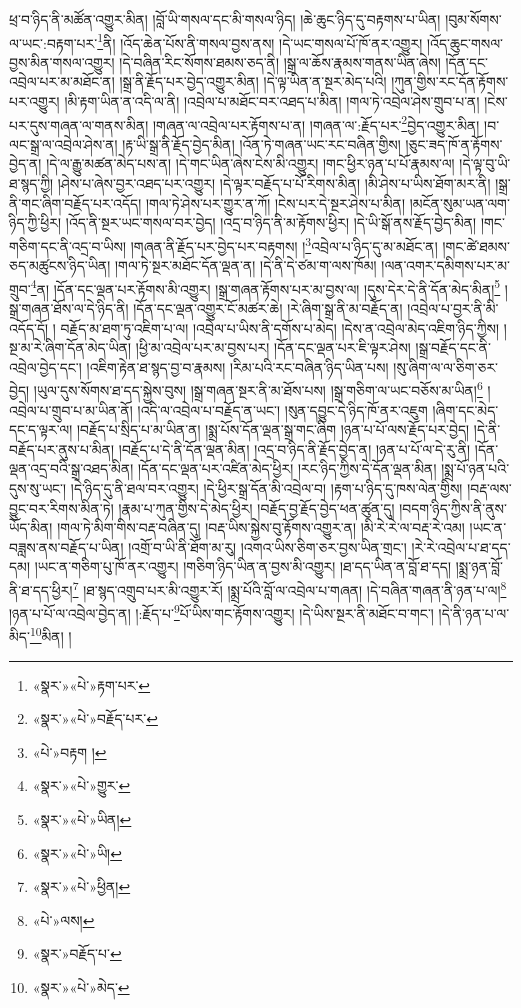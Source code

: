 ཕྲ་བ་ཉིད་ནི་མཚོན་འགྱུར་མིན། །བློ་ཡི་གསལ་དང་མི་གསལ་ཉིད། །ཆེ་ཆུང་ཉིད་དུ་བརྟགས་པ་ཡིན། །བུམ་སོགས་ལ་ཡང་:བརྟག་པར་\footnote{«སྣར་»«པེ་»རྟག་པར་}ནི། །འོད་ཆེན་པོས་ནི་གསལ་བྱས་ནས། །དེ་ཡང་གསལ་པོ་ཁོ་ནར་འགྱུར། །འོད་ཆུང་གསལ་བྱས་མིན་གསལ་འགྱུར། །དེ་བཞིན་རིང་སོགས་ཐམས་ཅད་ནི། །སྒྲ་ལ་ཆོས་རྣམས་གནས་ཡིན་ཞེས། །དོན་དང་འབྲེལ་པར་མ་མཐོང་ན། །སྒྲ་ནི་རྗོད་པར་བྱེད་འགྱུར་མིན། །དེ་ལྟ་ཡིན་ན་སྔར་མེད་པའི། །ཀུན་གྱིས་རང་དོན་རྟོགས་པར་འགྱུར། །མི་རྟག་ཡིན་ན་འདི་ལ་ནི། །འབྲེལ་པ་མཐོང་བར་འཐད་པ་མིན། །གལ་ཏེ་འབྲེལ་ཤེས་གྲུབ་པ་ན། །ངེས་པར་དུས་གཞན་ལ་གནས་མིན། །གཞན་ལ་འབྲེལ་པར་རྟོགས་པ་ན། །གཞན་ལ་:རྗོད་པར་\footnote{«སྣར་»«པེ་»བརྗོད་པར་}བྱེད་འགྱུར་མིན། །བ་ལང་སྒྲ་ལ་འབྲེལ་ཤེས་ན། །རྟ་ཡི་སྒྲ་ནི་རྗོད་བྱེད་མིན། །འོན་ཏེ་གཞན་ཡང་རང་བཞིན་གྱིས། །ཅུང་ཟད་ཁོ་ན་རྟོགས་བྱེད་ན། །དེ་ལ་རྒྱུ་མཚན་མེད་པས་ན། །དེ་གང་ཡིན་ཞེས་ངེས་མི་འགྱུར། །གང་ཕྱིར་ཉན་པ་པོ་རྣམས་ལ། །དེ་ལྟ་བུ་ཡི་ཐ་སྙད་ཀྱི། །ཤེས་པ་ཞེས་བྱར་འཐད་པར་འགྱུར། །དེ་ལྟར་བརྗོད་པ་པོ་རིགས་མིན། །མི་ཤེས་པ་ཡིས་ཐོག་མར་ནི། །སྒྲ་ནི་གང་ཞིག་བརྗོད་པར་འདོད། །གལ་ཏེ་ཤེས་པར་གྱུར་ན་ཀོ། །ངེས་པར་དེ་སྔར་ཤེས་པ་མིན། །མངོན་སུམ་ཡན་ལག་ཉིད་ཀྱི་ཕྱིར། །འོད་ནི་སྔར་ཡང་གསལ་བར་བྱེད། །འདྲ་བ་ཉིད་ནི་མ་རྟོགས་ཕྱིར། །དེ་ཡི་སྒོ་ནས་རྗོད་བྱེད་མིན། །གང་གཅིག་དང་ནི་འདྲ་བ་ཡིས། །གཞན་ནི་རྗོད་པར་བྱེད་པར་བརྟགས། །\footnote{«པེ་»བརྟག །}འབྲེལ་པ་ཉིད་དུ་མ་མཐོང་ན། །གང་ཚེ་ཐམས་ཅད་མཚུངས་ཉིད་ཡིན། །གལ་ཏེ་སྔར་མཐོང་དོན་ལྡན་ན། །དེ་ནི་དེ་ཙམ་ག་ལས་ཁོམ། །ལན་འགར་དམིགས་པར་མ་གྲུབ་\footnote{«སྣར་»«པེ་»གྱུར་}ན། །དོན་དང་ལྡན་པར་རྟོགས་མི་འགྱུར། །སྒྲ་གཞན་རྟོགས་པར་མ་བྱས་ལ། །དུས་དེར་དེ་ནི་དོན་མེད་མིན།\footnote{«སྣར་»«པེ་»ཡིན།} །སྒྲ་གཞན་ཐོས་ལ་དེ་ཉིད་ནི། །དོན་དང་ལྡན་འགྱུར་ངོ་མཚར་ཆེ། །རེ་ཞིག་སྒྲ་ནི་མ་བརྗོད་ན། །འབྲེལ་པ་བྱར་ནི་མི་འདོད་དོ། །
བརྗོད་མ་ཐག་ཏུ་འཇིག་པ་ལ། །འབྲེལ་པ་ཡིས་ནི་དགོས་པ་མེད། །དེས་ན་འབྲེལ་མེད་འཇིག་ཉིད་ཀྱིས། །སྔ་མ་རེ་ཞིག་དོན་མེད་ཡིན། །ཕྱི་མ་འབྲེལ་པར་མ་བྱས་པར། །དོན་དང་ལྡན་པར་ཇི་ལྟར་ཤེས། །སྒྲ་བརྗོད་དང་ནི་འབྲེལ་བྱེད་དང་། །འཇིག་རྟེན་ཐ་སྙད་བྱ་བ་རྣམས། །རིམ་པའི་རང་བཞིན་ཉིད་ཡིན་པས། །སུ་ཞིག་ལ་ལ་ཅིག་ཅར་བྱེད། །ཡུལ་དུས་སོགས་ཐ་དད་སྐྱེས་བུས། །སྒྲ་གཞན་སྔར་ནི་མ་ཐོས་པས། །སྒྲ་གཅིག་ལ་ཡང་བཅོས་མ་ཡིན།\footnote{«སྣར་»«པེ་»ཡི།} །འབྲེལ་པ་གྲུབ་པ་མ་ཡིན་ནོ། །འདི་ལ་འབྲེལ་པ་བརྗོད་ན་ཡང་། །སུན་དབྱུང་དེ་ཉིད་ཁོ་ནར་འཇུག །ཞིག་དང་མེད་དང་ད་ལྟར་ལ། །བརྗོད་པ་སྲིད་པ་མ་ཡིན་ན། །སྨྲ་པོས་དོན་ལྡན་སྒྲ་གང་ཞིག །ཉན་པ་པོ་ལས་རྗོད་པར་བྱེད། །དེ་ནི་བརྗོད་པར་ནུས་པ་མིན། །བརྗོད་པ་དེ་ནི་དོན་ལྡན་མིན། །འདྲ་བ་ཉིད་ནི་རྗོད་བྱེད་ན། །ཉན་པ་པོ་ལ་དེ་རུ་ནི། །དོན་ལྡན་འདྲ་བའི་སྒྲ་འཐད་མིན། །དོན་དང་ལྡན་པར་འཛིན་མེད་ཕྱིར། །རང་ཉིད་ཀྱིས་དེ་དོན་ལྡན་མིན། །སྨྲ་པོ་ཉན་པའི་དུས་སུ་ཡང་། །དེ་ཉིད་དུ་ནི་ཐལ་བར་འགྱུར། །དེ་ཕྱིར་སྒྲ་དོན་མི་འབྲེལ་བ། །རྟག་པ་ཉིད་དུ་ཁས་ལེན་གྱིས། །བརྡ་ལས་བྱུང་བར་རིགས་མིན་ཏེ། །རྣམ་པ་ཀུན་གྱིས་དེ་མེད་ཕྱིར། །བརྗོད་བྱ་རྗོད་བྱེད་ཕན་ཚུན་དུ། །བདག་ཉིད་ཀྱིས་ནི་ནུས་ཡོད་མིན། །གལ་ཏེ་མིག་གིས་བརྡ་བཞིན་དུ། །བརྡ་ཡིས་སྐྱེས་བུ་རྟོགས་འགྱུར་ན། །མི་རེ་རེ་ལ་བརྡ་རེ་འམ། །ཡང་ན་བཟླས་ནས་བརྗོད་པ་ཡིན། །འགྲོ་བ་ཡི་ནི་ཐོག་མ་རུ། །འགའ་ཡིས་ཅིག་ཅར་བྱས་ཡིན་གྲང་། །རེ་རེ་འབྲེལ་པ་ཐ་དད་དམ། །ཡང་ན་གཅིག་པུ་ཁོ་ནར་འགྱུར། །གཅིག་ཉིད་ཡིན་ན་བྱས་མི་འགྱུར། །ཐ་དད་ཡིན་ན་བློ་ཐ་དད། །སྨྲ་ཉན་བློ་ནི་ཐ་དད་ཕྱིར།\footnote{«སྣར་»«པེ་»ཕྱིན།} །ཐ་སྙད་འགྲུབ་པར་མི་འགྱུར་རོ། །སྨྲ་པོའི་བློ་ལ་འབྲེལ་པ་གཞན། །དེ་བཞིན་གཞན་ནི་ཉན་པ་ལ།\footnote{«པེ་»ལས།} །ཉན་པ་པོ་ལ་འབྲེལ་བྱེད་ན། །:རྗོད་པ་\footnote{«སྣར་»བརྗོད་པ་}པོ་ཡིས་གང་རྟོགས་འགྱུར། །དེ་ཡིས་སྔར་ནི་མཐོང་བ་གང་། །དེ་ནི་ཉན་པ་ལ་མིད་\footnote{«སྣར་»«པེ་»མེད་}མིན། །

